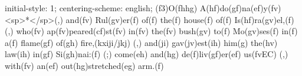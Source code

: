 initial-style: 1;
centering-scheme: english;
(f3)O(fhhg) A(hf)do(gf)na(ef)y(fv) <sp>*</sp>(,) and(fv) Rul(gv)er(f) of(f) the(f) house(f) of(f) Is(hf)ra(gv)el,(f) (,) who(fv) ap(fv)peared(cf)st(fv) in(fv) the(fv) bush(gv) to(f) Mo(gv)ses(f) in(f) a(f) flame(gf) of(gh) fire,(kxiji/jkj) (,) and(ji) gav(jv)est(ih) him(g) the(hv) law(ih) in(gf) Si(gh)nai:(f) (;) come(eh) and(hg) de(f)liv(gf)er(ef) us(fvEC) (,) with(fv) an(ef) out(hg)stretched(eg) arm.(f)
